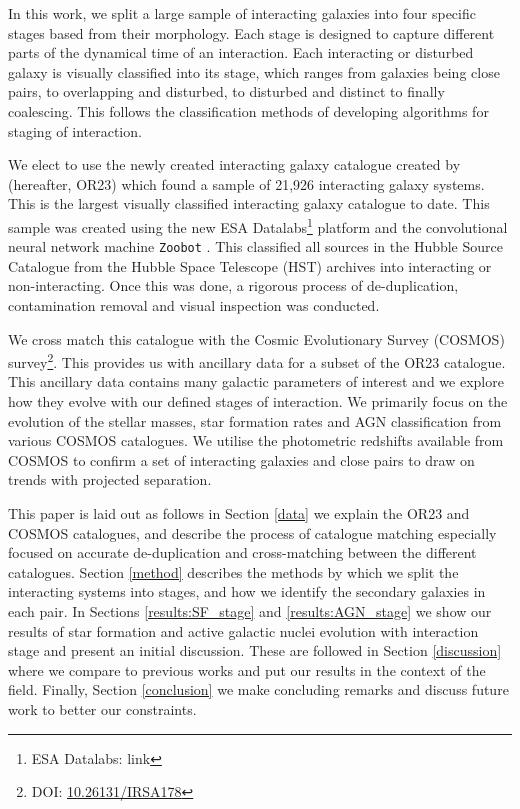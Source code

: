 \documentclass[fleqn,usenatbib]{mnras}
\begin{document}
In this work, we split a large sample of interacting galaxies into four specific stages based from their morphology. Each stage is designed to capture different parts of the dynamical time of an interaction. Each interacting or disturbed galaxy is visually classified into its stage, which ranges from galaxies being close pairs, to overlapping and disturbed, to disturbed and distinct to finally coalescing. This follows the classification methods of developing algorithms for staging of interaction\citep{2019MNRAS.490.5390B,2022ApJ...937...97C}. 

We elect to use the newly created interacting galaxy catalogue created by \citet{2023ApJ...948...40O} (hereafter, OR23) which found a sample of 21,926 interacting galaxy systems. This is the largest visually classified interacting galaxy catalogue to date. This sample was created using the new ESA Datalabs\footnote{ESA Datalabs: link} platform and the convolutional neural network machine \texttt{Zoobot} \citep{2022MNRAS.509.3966W, 2023JOSS....8.5312W}. This classified all sources in the Hubble Source Catalogue \citep{2016AJ....151..134W} from the Hubble Space Telescope (HST) archives into interacting or non-interacting. Once this was done, a rigorous process of de-duplication, contamination removal and visual inspection was conducted.

We cross match this catalogue with the Cosmic Evolutionary Survey (COSMOS) survey\footnote{DOI: \href{https://www.ipac.caltech.edu/doi/irsa/10.26131/IRSA178}{10.26131/IRSA178}}. This provides us with ancillary data for a subset of the OR23 catalogue. This ancillary data contains many galactic parameters of interest and we explore how they evolve with our defined stages of interaction. We primarily focus on the evolution of the stellar masses, star formation rates and AGN classification from various COSMOS catalogues. We utilise the photometric redshifts available from COSMOS to confirm a set of interacting galaxies and close pairs to draw on trends with projected separation.

This paper is laid out as follows in Section \ref{data} we explain the OR23 and COSMOS catalogues, and describe the process of catalogue matching especially focused on accurate de-duplication and cross-matching between the different catalogues.  Section \ref{method} describes the methods by which we split the interacting systems into stages, and how we identify the secondary galaxies in each pair. In Sections \ref{results:SF_stage} and \ref{results:AGN_stage} we show our results of star formation and active galactic nuclei evolution with interaction stage and present an initial discussion. These are followed in Section \ref{discussion} where we compare to previous works and put our results in the context of the field. Finally, Section \ref{conclusion} we make concluding remarks and discuss future work to better our constraints. 
\end{document}
